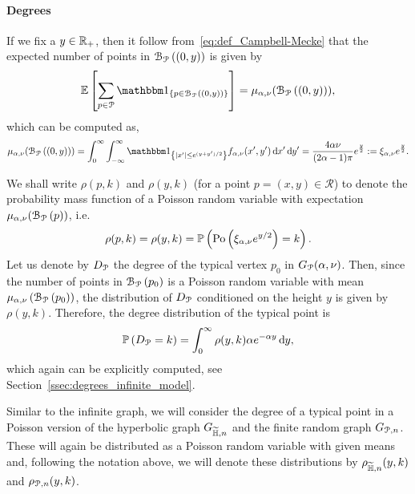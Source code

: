 \paragraph{Degrees}
If we fix a $y \in {\ensuremath{\mathbb R}}_+$, then it follow from~\eqref{eq:def_Campbell-Mecke} that the expected number of points in ${\mathcal B}_{{\mathcal P}}\left((0,y)\right)$ is given by
\[
	\Exp{\sum_{p \in \Pcal} \ind{p \in \BallPo{(0,y)}}} = \mu_{\alpha, \nu}(\BallPo{(0,y)}), 
\] 
which can be computed as,
\begin{equation}\label{eq:mu_ball_y_P}
	\mu_{\alpha, \nu}(\BallPo{(0,y)}) =  \int_0^\infty \int_{-\infty}^\infty \ind{|x^\prime|\le e^{(y + y^\prime)/2}} 
	f_{\alpha,\nu}(x^\prime,y^\prime) \dd x^\prime \dd y^\prime
	= \frac{4\alpha \nu}{(2\alpha - 1)\pi} e^{\frac{y}{2}} := \xi_{\alpha,\nu}e^{\frac{y}{2}}.
\end{equation}

We shall write $\rho(p,k)$ and $\rho(y,k)$ (for a point $p=(x,y) \in \mathcal{R}$) to denote the probability mass function of a Poisson random variable with expectation $\mu_{\alpha, \nu}({\mathcal B}_{{\mathcal P}}\left(p\right))$, i.e.
\[
	\rho(p,k) = \rho(y,k) = \mathbb{P}\left({\mathrm{Po}}\left(\xi_{\alpha,\nu} e^{y/2}\right) = k\right).
\]
Let us denote by $D_{{\mathcal P}}$ the degree of the typical vertex $p_0$ in $G_{{\mathcal P}}(\alpha,\nu)$. Then, since the number of points in ${\mathcal B}_{{\mathcal P}}\left(p_0\right)$ is a Poisson random variable with mean $\mu_{\alpha,\nu}\left({\mathcal B}_{{\mathcal P}}\left(p_0\right)\right)$, the distribution of $D_{{\mathcal P}}$ conditioned on the height $y$ is given by $\rho(y,k)$. Therefore, the degree distribution of the typical point is 
\[
	\mathbb{P}\left(D_{{\mathcal P}} = k\right) = \int_0^\infty \rho(y,k) \alpha e^{-\alpha y} \operatorname{\mathrm{d}\hspace{-2pt}} y,
\]
which again can be explicitly computed, see Section~\ref{ssec:degrees_infinite_model}.

\begin{remark}
Similar to the infinite graph, we will consider the degree of a typical point in a Poisson version of the hyperbolic graph $G_{\widetilde{\mathbb{H}},n}$ and the finite random graph $G_{{\mathcal P},n}$. These will again be distributed as a Poisson random variable with given means and, following the notation above, we will denote these distributions by $\rho_{\widetilde{\mathbb{H}},n}(y,k)$ and $\rho_{{\mathcal P},n}(y,k)$.
\end{remark}

